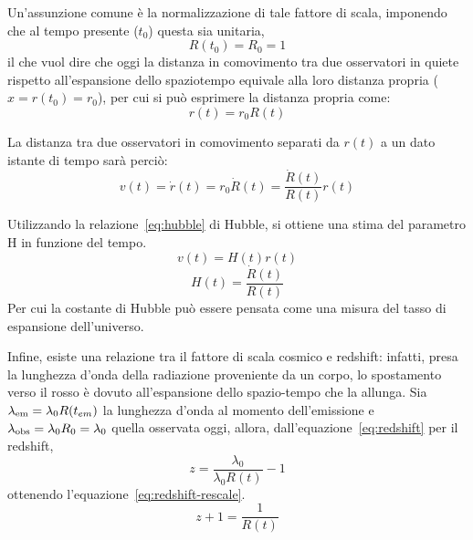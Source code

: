 Un'assunzione comune è la normalizzazione di tale fattore di scala, imponendo che al tempo presente ($t_0$) questa sia unitaria,
\[
    R(t_0) = R_0 = 1
\]
il che vuol dire che oggi la distanza in comovimento tra due osservatori in quiete rispetto all'espansione dello spaziotempo equivale alla loro distanza propria ($x = r(t_0) = r_0$), per cui si può esprimere la distanza propria come:
\[
    r(t)= r_0 R(t)
\]

La distanza tra due osservatori in comovimento separati da $r(t)$ a un dato istante di tempo sarà perciò:
\begin{equation}\label{eq:hubble-speed}
    v(t) = \dot{r}(t) = r_0 \dot{R}(t) = \frac{\dot{R}(t)}{R(t)}r(t)
\end{equation}

Utilizzando la relazione~\eqref{eq:hubble} di Hubble, si ottiene una stima del parametro H in funzione del tempo.
\[
    v(t) = H(t)r(t)
\]
\begin{equation}\label{eq:hubble-scale}
    H(t) = \frac{\dot{R}(t)}{R(t)}
\end{equation}
Per cui la costante di Hubble può essere pensata come una misura del tasso di espansione dell'universo.

Infine, esiste una relazione tra il fattore di scala cosmico e redshift: infatti, presa la lunghezza d'onda della radiazione proveniente da un corpo, lo spostamento verso il rosso è dovuto all'espansione dello spazio-tempo che la allunga. Sia $\lambda_\textup{em} = \lambda_0 R(t_{em})$ la lunghezza d'onda al momento dell'emissione e $\lambda_\textup{obs} = \lambda_0 R_0 = \lambda_0$ quella osservata oggi, allora, dall'equazione~\eqref{eq:redshift} per il redshift,
\[
    z = \frac{\lambda_0}{\lambda_0 R(t)}-1
\]
ottenendo l'equazione~\eqref{eq:redshift-rescale}.
\begin{equation}\label{eq:redshift-rescale}
    z + 1 = \frac{1}{R(t)} 
\end{equation}